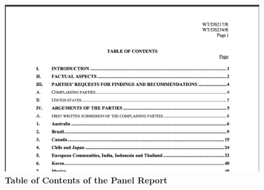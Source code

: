 \begin{figure}[h]
    \centering
    \includegraphics[scale=0.3]{Data/pngs/panel_report_toc.png}
    \caption{{\bf Table of Contents of the Panel Report}}
\end{figure}

